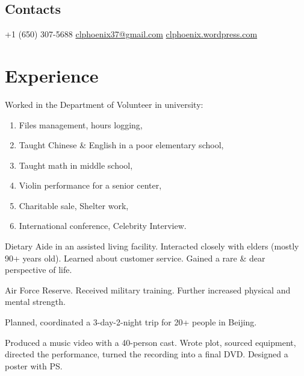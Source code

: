 \documentclass[]{friggeri-cv}
\begin{document}


\begin{aside} %
  \section{Contacts}
  +1 (650) 307-5688
  \href{mailto:clphoenix37+cv@gmail.com}{clphoenix37@gmail.com}
  \href{https://clphoenix.wordpress.com/}{clphoenix.wordpress.com}
\end{aside}


\section{Experience}

Worked in the Department of Volunteer in university:
\begin{enumerate}
\item Files management, hours logging,
\item Taught Chinese \& English in a poor elementary school,
\item Taught math in middle school,
\item Violin performance for a senior center,
\item Charitable sale, Shelter work,
\item International conference, Celebrity Interview.
\end{enumerate}

Dietary Aide in an assisted living facility. Interacted closely with elders (mostly
90+ years old). Learned about customer service. Gained a rare \& dear
perspective of life.

Air Force Reserve. Received military training. Further increased physical and
mental strength.

Planned, coordinated a 3-day-2-night trip for 20+ people in Beijing.

Produced a music video with a 40-person cast. Wrote plot, sourced equipment,
directed the performance, turned the recording into a final DVD. Designed a
poster with PS.
\end{document}
